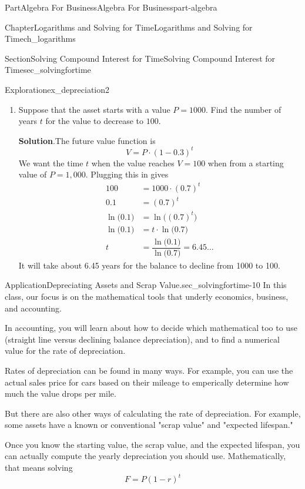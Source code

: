 \documentclass{tufte-book}
\newcommand{\blocktitlefont}{\relax}
\numberwithin{equation}{chapter}
\newcommand{\amp}{&}
\begin{document}
\begin{partptx}{Part}{Algebra For Business}{}{Algebra For Business}{}{}{part-algebra}
\begin{chapterptx}{Chapter}{Logarithms and Solving for Time}{}{Logarithms and Solving for Time}{}{}{ch_logarithms}
\begin{sectionptx}{Section}{Solving Compound Interest for Time}{}{Solving Compound Interest for Time}{}{}{sec_solvingfortime}
\begin{exploration}{Exploration}{}{ex_depreciation2}
\begin{enumerate}[font=\bfseries,label=(\alph*),ref=\alph*]
The starting value must have been about \textdollar{}3,612.38%
\item{}Suppose that the asset starts with a value \(P=1000\). Find the number of years \(t\) for the value to decrease to \(100\).%
\par\smallskip%
\noindent\textbf{\blocktitlefont Solution}.\hypertarget{ex_depreciation2-4-2}{}\quad{}The future value function is%
\begin{equation*}
V = P \cdot (1-0.3)^t 
\end{equation*}
We want the time \(t\) when the value reaches \(V=100\) when from a starting value of \(P=1,000\).  Plugging this in gives%
\begin{align*}
100 \amp = 1000 \cdot (0.7)^t\\
0.1 \amp =  (0.7)^t\\
\ln\Big(0.1\Big) \amp =  \ln\Big((0.7)^t\Big)\\
\ln\Big(0.1\Big) \amp =  t\cdot \ln\Big(0.7\Big)\\
t \amp = \dfrac{ \ln\Big(0.1\Big)}{\ln\Big(0.7\Big)} = 6.45\dots
\end{align*}
It will take about 6.45 years for the balance to decline from 1000 to 100.%
\end{enumerate}%
\end{exploration}%
\begin{insight}{Application}{Depreciating Assets and Scrap Value.}{sec_solvingfortime-10}%
In this class, our focus is on the mathematical tools that underly economics, business, and accounting.%
\par
In accounting, you will learn about how to decide which mathematical too to use (straight line versus declining balance depreciation), and to find a numerical value for the rate of depreciation.%
\par
Rates of depreciation can be found in many ways. For example, you can use the actual sales price for cars based on their mileage to emperically determine how much the value drops per mile.%
\par
But there are also other ways of calculating the rate of depreciation. For example, some assets have a known or conventional "scrap value" and "expected lifespan."%
\par
Once you know the starting value, the scrap value, and the expected lifespan, you can actually compute the yearly depreciation you should use. Mathematically, that means solving%
\begin{equation*}
F = P ( 1- r)^t
\end{equation*}

\end{insight}
\end{sectionptx}
\end{chapterptx}
\end{partptx}
\end{document}
